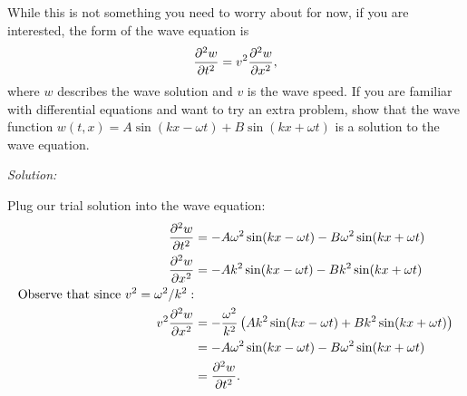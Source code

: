 \documentclass{article}
\begin{document}
\newpage

\begin{tcolorbox}[arc=2mm, title=\textsc{The Wave Equation (Enrichment)}]
	While this is not something you need to worry about for now, if you are interested, the form of the wave equation is 
	\[
		\pdv[2]{w}{t} = v^2 \pdv[2]{w}{x},
	\]
	where $w$ describes the wave solution and $v$ is the wave speed. If you are familiar with differential equations and want to try an extra problem, show that the wave function $w(t,x) = A\sin(kx-\omega t) + B\sin(kx+\omega t)$ is a solution to the wave equation.
\end{tcolorbox}

\textit{Solution:}

\vspace{1em}

Plug our trial solution into the wave equation:
\begin{align*}
    \pdv[2]{w}{t} &= -A\omega^2 \sin(kx-\omega t) - B\omega^2 \sin(kx+\omega t) \\
    \pdv[2]{w}{x} &= -Ak^2 \sin(kx-\omega t) - Bk^2 \sin(kx+\omega t) \\
    \text{Observe that since }v^2 = \omega^2 / k^2:& \\
    v^2 \pdv[2]{w}{x} &= -\frac{\omega^2}{k^2}\left( Ak^2\sin(kx-\omega t) + Bk^2 \sin(kx + \omega t) \right) \\
    &= -A\omega^2 \sin(kx-\omega t) - B\omega^2 \sin(kx+\omega t) \\
    &= \pdv[2]{w}{t}.
\end{align*}
\end{document}

